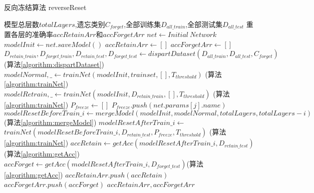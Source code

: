 \begin{algorithm}
	\renewcommand{\algorithmicrequire}{\textbf{Input:}}
	\renewcommand{\algorithmicensure}{\textbf{Output:}}
	\caption{反向冻结算法 reverseReset}
	\label{algorithm:reverseReset}
	\begin{algorithmic}[1]
        \REQUIRE 模型总层数$totalLayers$,遗忘类别$C_{forget}$,全部训练集$D_{all\_train}$,全部测试集$D_{all\_test}$
        \ENSURE  重置各层的准确率$accRetainArr$和$accForgetArr$
        \STATE $net \gets Initial\ Network$
        \STATE $modelInit \gets net.saveModel()$
        \STATE $accRetainArr \gets []$
        \STATE $accForgetArr \gets []$
        \STATE $D_{retain\_train}, D_{forget\_train}, D_{retain\_test}, D_{forget\_test} \gets dispartDataset(D_{all\_train}, D_{all\_test}, C_{forget})$ (算法\ref{algorithm:dispartDataset})
        \STATE $modelNormal,\_ \gets trainNet(modelInit, trainset, [], T_{threshold})$ (算法\ref{algorithm:trainNet})
        \STATE $modelRetrain,\_ \gets trainNet(modelInit, D_{retain\_train}, [], T_{threshold})$ (算法\ref{algorithm:trainNet})
        \STATE $P_{freeze} \gets []$
                    \STATE $P_{freeze}.push(net.params[j].name)$
                \ENDIF
            \ENDFOR
            \STATE $modelResetBeforeTrain\_i \gets mergeModel(modelInit, modelNormal, totalLayers, totalLayers - i)$  (算法\ref{algorithm:mergeModel})
            \STATE $modelResetAfterTrain\_i \gets$ $trainNet(modelResetBeforeTrain\_i , D_{retain\_test}, P_{freeze}, T_{threshold})$  (算法\ref{algorithm:trainNet})
            \STATE $accRetain \gets getAcc(modelResetAfterTrain\_i, D_{retain\_test})$ (算法\ref{algorithm:getAcc})
            \STATE $accForget \gets getAcc(modelResetAfterTrain\_i, D_{forget\_test})$(算法\ref{algorithm:getAcc})
            \STATE $accRetainArr.push(accRetain)$
            \STATE $accForgetArr.push(accForget)$
        \ENDFOR
        \RETURN $accRetainArr, accForgetArr$
	\end{algorithmic}  
\end{algorithm}

